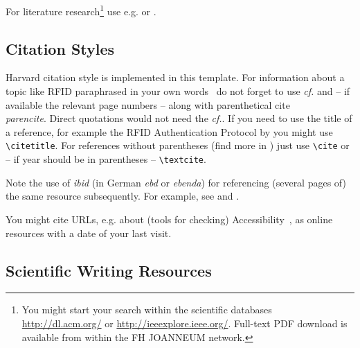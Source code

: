 For literature research\footnote{You might start your search within the scientific databases \url{http://dl.acm.org/} or \url{http://ieeexplore.ieee.org/}. Full-text PDF download is available from within the FH JOANNEUM network.} use e.g.  \parencite{acm:diglibrary} or  \parencite{ieee:xplore}.

\subsection{Citation Styles}
Harvard citation style is implemented in this template. For information about a topic like RFID paraphrased in your own words~\parencite[cf.][pg 317]{Batina:2011} do not forget to use \emph{cf.} and -- if available the relevant page numbers -- along with parenthetical cite \emph{\\parencite}. Direct quotations would not need the \emph{cf.}. If you need to use the title of a reference, for example the RFID Authentication Protocol by  you might use \verb+\citetitle+. For references without parentheses (find more in \cite{Li:2008}) just use \verb+\cite+ or -- if year should be in parentheses -- \textcite{Batina:2011} \verb+\textcite+.

\begin{spar}
Note the use of \emph{ibid} (in German \emph{ebd} or \emph{ebenda}) for referencing (several pages of) the same resource subsequently. For example, see \citep[cf.][pg 317]{Batina:2011} and \citep[cf.][pg 321]{Batina:2011} \citep[cf.][pg 399]{Batina:2011}.
\end{spar}

You might cite URLs, e.g. about (tools for checking) Accessibility~\parencite[cf.][]{Google:2017a,Google:2016a}, as online resources with a date of your last visit.


\subsection{Scientific Writing Resources}


